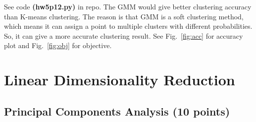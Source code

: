 \documentclass[a4paper]{article}
\theoremstyle{definition}
\newenvironment{soln}{
    \leavevmode\color{blue}\ignorespaces
}{}
\begin{document}
\begin{soln}
See code \textbf{(hw5p12.py)} in repo. The GMM would give better clustering accuracy than K-means clustering. The reason is that GMM is a soft clustering method, which means it can assign a point to multiple clusters with different probabilities. So, it can give a more accurate clustering result. See Fig.~\ref{fig:acc} for accuracy plot and Fig.~\ref{fig:obj} for objective. \\
\begin{figure}[h]
    \centering
    \hfil
    \caption{}%
    \label{fig:out_results}
\end{figure}
\end{soln}

\section{Linear Dimensionality Reduction}

\subsection{Principal Components Analysis  (10 points)}
\label{sec:pca}
\end{document}
